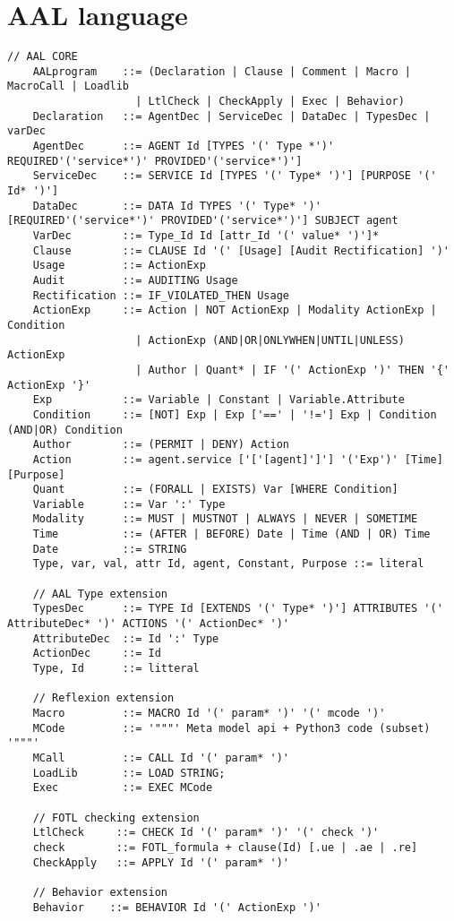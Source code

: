 \section{AAL language}
\begin{lstlisting}[caption={AAL Syntax}, label=syntax]
    // AAL CORE
    AALprogram    ::= (Declaration | Clause | Comment | Macro | MacroCall | Loadlib
                    | LtlCheck | CheckApply | Exec | Behavior)
    Declaration   ::= AgentDec | ServiceDec | DataDec | TypesDec | varDec
    AgentDec      ::= AGENT Id [TYPES '(' Type *')' REQUIRED'('service*')' PROVIDED'('service*')']
    ServiceDec    ::= SERVICE Id [TYPES '(' Type* ')'] [PURPOSE '(' Id* ')']
    DataDec       ::= DATA Id TYPES '(' Type* ')' [REQUIRED'('service*')' PROVIDED'('service*')'] SUBJECT agent
    VarDec        ::= Type_Id Id [attr_Id '(' value* ')']*
    Clause        ::= CLAUSE Id '(' [Usage] [Audit Rectification] ')'
    Usage         ::= ActionExp
    Audit         ::= AUDITING Usage
    Rectification ::= IF_VIOLATED_THEN Usage
    ActionExp     ::= Action | NOT ActionExp | Modality ActionExp | Condition
                    | ActionExp (AND|OR|ONLYWHEN|UNTIL|UNLESS) ActionExp
                    | Author | Quant* | IF '(' ActionExp ')' THEN '{' ActionExp '}'
    Exp           ::= Variable | Constant | Variable.Attribute
    Condition     ::= [NOT] Exp | Exp ['==' | '!='] Exp | Condition (AND|OR) Condition
    Author        ::= (PERMIT | DENY) Action
    Action        ::= agent.service ['['[agent]']'] '('Exp')' [Time] [Purpose]
    Quant         ::= (FORALL | EXISTS) Var [WHERE Condition]
    Variable      ::= Var ':' Type
    Modality      ::= MUST | MUSTNOT | ALWAYS | NEVER | SOMETIME
    Time          ::= (AFTER | BEFORE) Date | Time (AND | OR) Time
    Date          ::= STRING
    Type, var, val, attr Id, agent, Constant, Purpose ::= literal

    // AAL Type extension
    TypesDec      ::= TYPE Id [EXTENDS '(' Type* ')'] ATTRIBUTES '(' AttributeDec* ')' ACTIONS '(' ActionDec* ')'
    AttributeDec  ::= Id ':' Type
    ActionDec     ::= Id
    Type, Id      ::= litteral

    // Reflexion extension
    Macro         ::= MACRO Id '(' param* ')' '(' mcode ')'
    MCode         ::= '"""' Meta model api + Python3 code (subset) '"""'
    MCall         ::= CALL Id '(' param* ')'
    LoadLib       ::= LOAD STRING;
    Exec          ::= EXEC MCode

    // FOTL checking extension
    LtlCheck     ::= CHECK Id '(' param* ')' '(' check ')'
    check        ::= FOTL_formula + clause(Id) [.ue | .ae | .re]
    CheckApply   ::= APPLY Id '(' param* ')'

    // Behavior extension
    Behavior    ::= BEHAVIOR Id '(' ActionExp ')'

\end{lstlisting}
